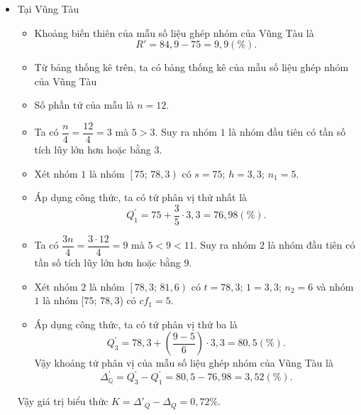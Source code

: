 \begin{ex}
{\begin{itemize}
\begin{itemize}
				\item Số phần tử của mẫu là $n=12$.
				\item Ta có $\dfrac{n}{4}=\dfrac{12}{4}=3$ mà $2< 3$. Suy ra nhóm $2$ là nhóm đầu tiên có tần số tích lũy lớn hơn hoặc bằng $3$. 
				\item Xét nhóm $2$ là nhóm $\left[81{,}6;\,84{,}9\right)$ có $s=81{,}6$; $h=3{,}3$; $n_2=1$ và nhóm $1$ là nhóm $\left[78{,}3;\,81{,}6\right)$ có $cf_1=2$.
				\item Áp dụng công thức, ta có tứ phân vị thứ nhất là
				\[Q_1=81{,}6+\left(\dfrac{3-2}{1} \right)\cdot 3{,}3=84{,}9\left(\% \right).
				\]
				\item Ta có $\dfrac{3n}{4}=\dfrac{3\cdot 12}{4}=9$ mà $3< 9< 10$. Suy ra nhóm $3$ là nhóm đầu tiên có tần số tích lũy lớn hơn hoặc bằng $9$.
				\item Xét nhóm $3$ là nhóm $\left[84{,}9;\,88{,}2\right)$ có $t=84{,}9$; $1=3{,}3$; $n_3=7$ và nhóm $2$ là nhóm $[81{,}6$; $84,9)$ có $cf_2=3$.
				\item Áp dụng công thức, ta có tứ phân vị thứ ba là
				\[Q_3=84{,}9+\left(\dfrac{9-3}{7} \right)\cdot 3{,}3\approx 87{,}7\left(\% \right).
				\]
				Vậy khoảng tứ phân vị của mẫu số liệu ghép nhóm của Đà Lạt là
				\[\Delta _{\mathbb{Q}}=Q_3-Q_1=87{,}7-84{,}9=2{,}8\left(\% \right).
				\]
			\end{itemize}			
			\item Tại Vũng Tàu
			\begin{itemize}
				\item Khoảng biến thiên của mẫu số liệu ghép nhóm của Vũng Tàu là \[R'=84{,}9-75=9{,}9 (\%).\]
				\item Từ bảng thống kê trên, ta có bảng thống kê của mẫu số liệu ghép nhóm của Vũng Tàu
				
				\item Số phần tử của mẫu là $n=12$.
				\item Ta có $\dfrac{n}{4}=\dfrac{12}{4}=3$ mà $5> 3$. Suy ra nhóm $1$ là nhóm đầu tiên có tần số tích lũy lớn hơn hoặc bằng $3$.
				\item Xét nhóm $1$ là nhóm $\left[75;\,78{,}3\right)$ có $s=75$; $h=3{,}3$; $n_1=5$.
				\item Áp dụng công thức, ta có tứ phân vị thứ nhất là
				\[Q_1^{'}=75+\dfrac{3}{5} \cdot 3{,}3=76{,}98\left(\% \right).
				\]
				\item Ta có $\dfrac{3n}{4}=\dfrac{3\cdot 12}{4}=9$ mà $5< 9< 11$. Suy ra nhóm $2$ là nhóm đầu tiên có tần số tích lũy lớn hơn hoặc bằng $9$.
				\item Xét nhóm $2$ là nhóm $\left[78{,}3;\,81{,}6\right)$ có $t=78{,}3$; $1=3{,}3$; $n_2=6$ và nhóm $1$ là nhóm $[75;\,78{,}3$) có $cf_1=5$.
				\item Áp dụng công thức, ta có tứ phân vị thứ ba là
				\[Q_3^{'}=78{,}3+\left(\dfrac{9-5}{6} \right)\cdot 3,3=80{,}5\left(\% \right).
				\]
				Vậy khoảng tứ phân vị của mẫu số liệu ghép nhóm của Vũng Tàu là
				\[\Delta _{\mathbb{Q}}^{'}=Q_3^{'}-Q_1^{'}=80{,}5-76{,}98=3{,}52\left(\% \right).
				\]
			\end{itemize}	
			Vậy giá trị biểu thức $K=\Delta '_Q-\Delta_Q=0{,}72\%$.
		\end{itemize}
	}
\end{ex}
